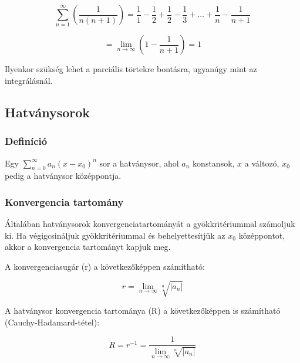 \documentclass{article}
\begin{document}
\begin{equation*}
    \sum_{n=1}^{\infty} \left(\frac{1}{n(n+1)} \right) = \frac{1}{1} - \frac{1}{2}+ \frac{1}{2} - \frac{1}{3}  + \ldots +  \frac{1}{n} - \frac{1}{n+1}
\end{equation*}

\begin{equation*}
    = \lim_{n \to \infty} \left(1 - \frac{1}{n+1}\right) = 1
\end{equation*}


Ilyenkor szükség lehet a parciális törtekre bontásra, ugyanúgy mint az integrálásnál.

\newpage

\subsection{Hatványsorok}

\subsubsection{Definíció}

Egy $\sum_{n=0}^{\infty} a_n(x - x_0)^n$ sor a hatványsor, ahol $a_n$ konstansok, $x$ a változó, $x_0$ pedig a hatványsor középpontja.

\subsubsection{Konvergencia tartomány}

Általában hatványsorok konvergenciatartományát a gyök\-kri\-té\-ri\-um\-mal szá\-mol\-juk ki. Ha vé\-gig\-csi\-nál\-juk
gyökkritériummal és be\-he\-lyet\-te\-sít\-jük az $x_0$ kö\-zép\-pon\-tot, akkor a kon\-ver\-gen\-cia tartományt kapjuk meg.

A konvergenciasugár (r) a következőképpen számítható:

\begin{equation*}
    r = \lim_{n \to \infty} \sqrt[n]{\left\lvert a_n \right\rvert}
\end{equation*}

\vspace{4mm}

A hatványsor konvergencia tartománya (R) a következőképpen is számítható (Cauchy-Hadamard-tétel):

\begin{equation*}
    R = r^{-1} =\frac{1}{\lim_{n \to \infty} \sqrt[n]{\left\lvert a_n \right\rvert}}
\end{equation*}
\end{document}

